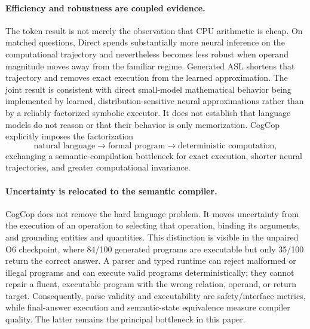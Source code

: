 \documentclass[11pt]{article}
\begin{document}
\paragraph{Efficiency and robustness are coupled evidence.}
The token result is not merely the observation that CPU arithmetic is cheap.
On matched questions, Direct spends substantially more neural inference on the
computational trajectory and nevertheless becomes less robust when operand
magnitude moves away from the familiar regime.  Generated ASL shortens that
trajectory and removes exact execution from the learned approximation.  The
joint result is consistent with direct small-model mathematical behavior being
implemented by learned, distribution-sensitive neural approximations rather
than by a reliably factorized symbolic executor.  It does not establish that
language models do not reason or that their behavior is only memorization.
CogCop explicitly imposes the factorization
\[
  \text{natural language}\rightarrow\text{formal program}
  \rightarrow\text{deterministic computation},
\]
exchanging a semantic-compilation bottleneck for exact execution, shorter
neural trajectories, and greater computational invariance.

\paragraph{Uncertainty is relocated to the semantic compiler.}
CogCop does not remove the hard language problem.  It moves uncertainty from
the execution of an operation to selecting that operation, binding its
arguments, and grounding entities and quantities.  This distinction is visible
in the unpaired O6 checkpoint, where 84/100 generated programs are executable
but only 35/100 return the correct answer.  A parser and typed runtime can reject
malformed or illegal programs and can execute valid programs deterministically;
they cannot repair a fluent, executable program with the wrong relation,
operand, or return target.  Consequently, parse validity and executability are
safety/interface metrics, while final-answer execution and semantic-state
equivalence measure compiler quality.  The latter remains the principal
bottleneck in this paper.
\end{document}
